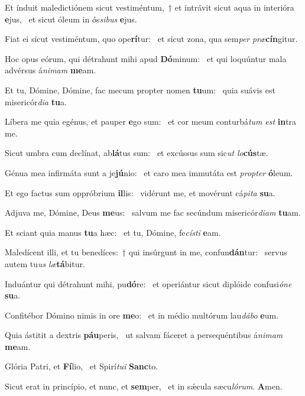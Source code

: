 \item Et índuit maledictiónem sicut vestiméntum,~† et intrávit sicut aqua in interióra \textbf{e}jus,~\psstar{} et sicut óleum in ós\textit{sibus} \textbf{e}jus.
\item Fiat ei sicut vestiméntum, quo ope\textbf{rí}tur:~\psstar{} et sicut zona, qua sem\textit{per} \textit{præ}\textbf{cín}gitur.
\item Hoc opus eórum, qui détrahunt mihi apud \textbf{Dó}minum:~\psstar{} et qui loquúntur mala advérsus á\textit{nimam} \textbf{me}am.
\item Et tu, Dómine, Dómine, fac mecum propter nomen \textbf{tu}um:~\psstar{} quia suávis est misericór\textit{dia} \textbf{tu}a.
\item Líbera me quia egénus, et pauper \textbf{e}go sum:~\psstar{} et cor meum conturbá\textit{tum} \textit{est} \textbf{in}tra me.
\item Sicut umbra cum declínat, ab\textbf{lá}tus sum:~\psstar{} et excússus sum sic\textit{ut} \textit{lo}\textbf{cús}tæ.
\item Génua mea infirmáta sunt a je\textbf{jú}nio:~\psstar{} et caro mea immutáta est \textit{propter} \textbf{ó}leum.
\item Et ego factus sum oppróbrium \textbf{il}lis:~\psstar{} vidérunt me, et movérunt cá\textit{pita} \textbf{su}a.
\item Adjuva me, Dómine, Deus \textbf{me}us:~\psstar{} salvum me fac secúndum misericór\textit{diam} \textbf{tu}am.
\item Et sciant quia manus \textbf{tu}a hæc:~\psstar{} et tu, Dómine, fe\textit{císti} \textbf{e}am.
\item Maledícent illi, et tu benedíces:~† qui insúrgunt in me, confun\textbf{dán}tur:~\psstar{} servus autem tu\textit{us} \textit{læ}\textbf{tá}bitur.
\item Induántur qui détrahunt mihi, pu\textbf{dó}re:~\psstar{} et operiántur sicut diplóide confusi\textit{óne} \textbf{su}a.
\item Confitébor Dómino nimis in ore \textbf{me}o:~\psstar{} et in médio multórum lau\textit{dábo} \textbf{e}um.
\item Quia ástitit a dextris \textbf{páu}peris,~\psstar{} ut salvam fáceret a persequéntibus á\textit{nimam} \textbf{me}am.
\item Glória Patri, et \textbf{Fí}lio,~\psstar{} et Spirí\textit{tui} \textbf{Sanc}to.
\item Sicut erat in princípio, et nunc, et \textbf{sem}per,~\psstar{} et in sǽcula sæcu\textit{lórum}. \textbf{A}men.
